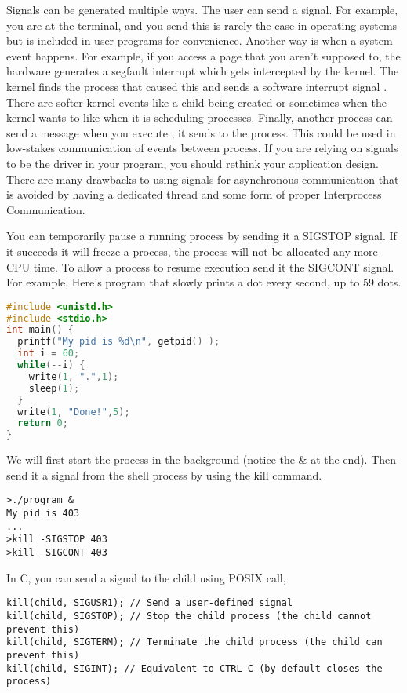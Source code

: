 Signals can be generated multiple ways. The user can send a signal. For example, you are at the terminal, and you send  this is rarely the case in operating systems but is included in user programs for convenience. Another way is when a system event happens. For example, if you access a page that you aren't supposed to, the hardware generates a segfault interrupt which gets intercepted by the kernel. The kernel finds the process that caused this and sends a software interrupt signal . There are softer kernel events like a child being created or sometimes when the kernel wants to like when it is scheduling processes. Finally, another process can send a message when you execute , it sends  to the process. This could be used in low-stakes communication of events between process. If you are relying on signals to be the driver in your program, you should rethink your application design. There are many drawbacks to using signals for asynchronous communication that is avoided by having a dedicated thread and some form of proper Interprocess Communication.

You can temporarily pause a running process by sending it a SIGSTOP signal. If it succeeds it will freeze a process, the process will not be allocated any more CPU time. To allow a process to resume execution send it the SIGCONT signal. For example, Here's program that slowly prints a dot every second, up to 59 dots.

\begin{lstlisting}[language=C]
#include <unistd.h>
#include <stdio.h>
int main() {
  printf("My pid is %d\n", getpid() );
  int i = 60;
  while(--i) {
    write(1, ".",1);
    sleep(1);
  }
  write(1, "Done!",5);
  return 0;
}
\end{lstlisting}

We will first start the process in the background (notice the \& at the end). Then send it a signal from the shell process by using the kill command.

\begin{verbatim}
>./program &
My pid is 403
...
>kill -SIGSTOP 403
>kill -SIGCONT 403
\end{verbatim}

In C, you can send a signal to the child using  POSIX call,

\begin{verbatim}
kill(child, SIGUSR1); // Send a user-defined signal
kill(child, SIGSTOP); // Stop the child process (the child cannot prevent this)
kill(child, SIGTERM); // Terminate the child process (the child can prevent this)
kill(child, SIGINT); // Equivalent to CTRL-C (by default closes the process)
\end{verbatim}

